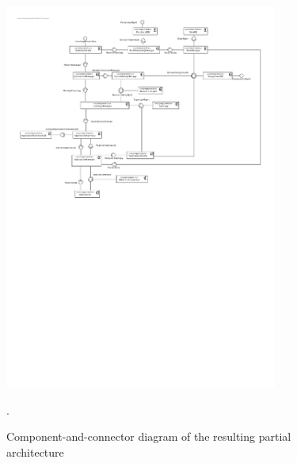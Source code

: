 \documentclass[english]{sareport}
\begin{document}
\begin{figure}[!htp]
	\centering
	\includegraphics[angle=90,width=0.8\textwidth]{result_arch.pdf}
	\caption{Component-and-connector diagram of the resulting partial architecture}.
	\label{fig:result-arch}
\end{figure}
\end{document}
